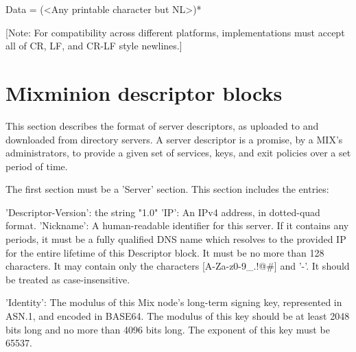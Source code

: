 Data = (<Any printable character but NL>)*

[Note: For compatibility across different platforms, implementations must
  accept all of CR, LF, and CR-LF style newlines.]

\section{Mixminion descriptor blocks}

This section describes the format of server descriptors, as uploaded
to and downloaded from directory servers.  A server descriptor is a
promise, by a MIX's administrators, to provide a given set of
services, keys, and exit policies over a set period of time.

The first section must be a 'Server' section.  This section includes
the entries:

     'Descriptor-Version':  the string "1.0"
     'IP': An IPv4 address, in dotted-quad format.
     'Nickname': A human-readable identifier for this server.  If it
         contains any periods, it must be a fully qualified DNS name
         which resolves to the provided IP for the entire lifetime of
         this Descriptor block.  It must be no more than 128
         characters.  It may contain only the characters 
         [A-Za-z0-9_.!@#] and '-'.  It should be treated as
         case-insensitive.

     'Identity': The modulus of this Mix node's long-term signing key,
         represented in ASN.1, and encoded in BASE64.  The modulus of
         this key should be at least 2048 bits long and no more than
         4096 bits long.  The exponent of this key must be 65537.

